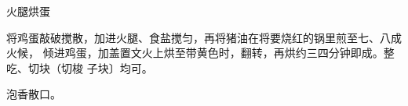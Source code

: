 \begin{recipe}{火腿烘蛋}

\ingredients


\preparation

将鸡蛋敲破搅散，加进火腿、食盐搅匀，再将猪油在将要烧红的锅里煎至七、八成火候，
倾进鸡蛋，加盖置文火上烘至带黄色时，翻转，再烘约三四分钟即成。整吃、切块（切梭
子块〕均可。

\features

泡香散口。

\end{recipe}

